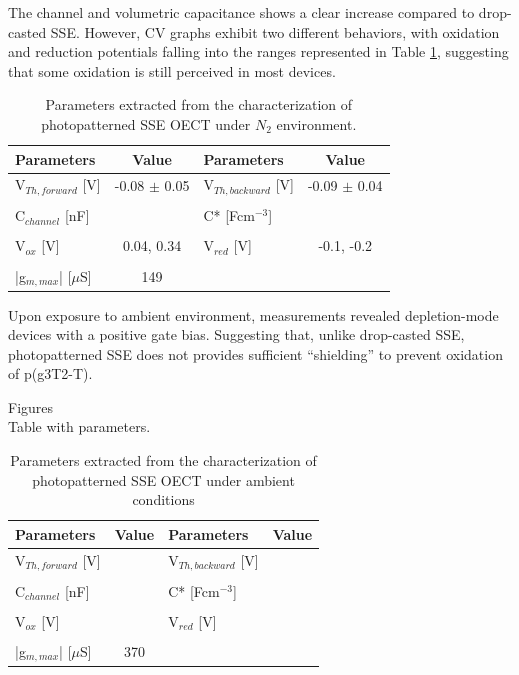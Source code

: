 The channel and volumetric capacitance shows a clear increase compared to drop-casted SSE. %
However, CV graphs exhibit two different behaviors, with oxidation and reduction potentials falling into the ranges represented in Table \ref{tab:photofom}, suggesting that some oxidation is still perceived in most devices.

\begin{table}[ht]
\centering
\caption{Parameters extracted from the characterization of photopatterned SSE OECT under $N_{2}$ environment.}
\begin{tabular}{l|c||l|c}
Parameters & Value & Parameters & Value \\\hline \hline
V$_{Th,forward}$ [V] & -0.08 $\pm$ 0.05 & V$_{Th,backward}$ [V] & -0.09 $\pm$ 0.04\\
& & &\\[-1em]
C$_{channel}$ [nF] & & C* [Fcm$^{-3}$] & \\
& & &\\[-1em]
V$_{ox}$ [V] & 0.04, 0.34  & V$_{red}$ [V] & -0.1, -0.2 \\
& & &\\[-1em]
|g$_{m,max}$| [$\mu$S] & 149 &  &\\\hline
\end{tabular}
\label{tab:photofom}
\end{table}

Upon exposure to ambient environment, measurements revealed depletion-mode devices with a positive gate bias. Suggesting that, unlike drop-casted SSE, photopatterned SSE does not provides sufficient ``shielding'' to prevent oxidation of p(g3T2-T).

Figures\\
Table with parameters.

\begin{table}[ht]
\centering
\caption{Parameters extracted from the characterization of photopatterned SSE OECT under ambient conditions}
\begin{tabular}{l|c||l|c}
Parameters & Value & Parameters & Value \\\hline \hline
V$_{Th,forward}$ [V] &  & V$_{Th,backward}$ [V] & \\
& & &\\[-1em]
C$_{channel}$ [nF] &  & C* [Fcm$^{-3}$] &  \\
& & &\\[-1em]
V$_{ox}$ [V] &   & V$_{red}$ [V] &  \\
& & &\\[-1em]
|g$_{m,max}$| [$\mu$S] & 370 &  &\\\hline
\end{tabular}
\label{tab:photofom_amb}
\end{table}

